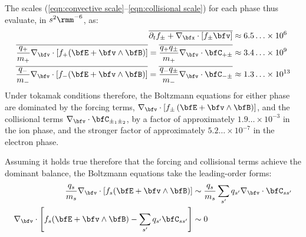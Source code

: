    The scales (\ref{eqn:convective scale}–\ref{eqn:collisional scale}) for each phase thus evaluate, in $s^{2}\rmm^{- 6}$, as:
    \begin{align}
        \overline{\partial_{t}f_{\pm} + \nabla_{\bfx}\cdot[f_{\pm}\bfv]}  &\approx  6.5\ldots\times 10^{6}  \\
        \overline{\frac{q_{+}}{m_{+}}\nabla_{\bfv}\cdot[f_{+}(\bfE + \bfv\wedge\bfB)]}  =  \overline{\frac{q_{+}q_{\pm}}{m_{+}}\nabla_{\bfv}\cdot\bfC_{+\pm}}  &\approx  3.4\ldots\times 10^{9}  \\
        \overline{\frac{q_{-}}{m_{-}}\nabla_{\bfv}\cdot[f_{-}(\bfE + \bfv\wedge\bfB)]}  =  \overline{\frac{q_{-}q_{\pm}}{m_{-}}\nabla_{\bfv}\cdot\bfC_{-\pm}}  &\approx  1.3\ldots\times 10^{13}
    \end{align}
    Under tokamak conditions therefore, the Boltzmann equations for either phase are dominated by the forcing terms, $\nabla_{\bfv}\cdot[f_{\pm}\left(\bfE + \bfv\wedge\bfB\right)]$, and the collisional terms $\nabla_{\bfv}\cdot\bfC_{\pm_{1}\pm_{2}}$, by a factor of approximately $1.9\ldots\times 10^{- 3}$ in the ion phase, and the stronger factor of approximately $5.2\ldots\times 10^{- 7}$ in the electron phase.


    Assuming it holds true therefore that the forcing and collisional terms achieve the dominant balance, the Boltzmann equations take the leading-order forms:
    \begin{align}\label{eqn:leading-order Boltzmann equation}
        \frac{q_{s}}{m_{s}}\nabla_{\bfv}\cdot[f_{s}(\bfE + \bfv\wedge\bfB)]  &\sim  \frac{q_{s}}{m_{s}}\sum_{s'}q_{s'}\nabla_{\bfv}\cdot\bfC_{ss'}  \\
        \nabla_{\bfv}\cdot\left[f_{s}(\bfE + \bfv\wedge\bfB) - \sum_{s'}q_{s'}\bfC_{ss'}\right]  &\sim  0
    \end{align}
    